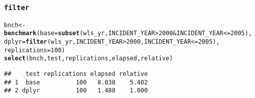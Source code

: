 \documentclass{beamer}\usepackage[]{graphicx}\usepackage[]{color}
\makeatletter
\newcommand{\hlnum}[1]{\textcolor[rgb]{0.686,0.059,0.569}{#1}}%
\newcommand{\hlopt}[1]{\textcolor[rgb]{0,0,0}{#1}}%
\newcommand{\hlstd}[1]{\textcolor[rgb]{0.345,0.345,0.345}{#1}}%
\newcommand{\hlkwb}[1]{\textcolor[rgb]{0.69,0.353,0.396}{#1}}%
\newcommand{\hlkwc}[1]{\textcolor[rgb]{0.333,0.667,0.333}{#1}}%
\newcommand{\hlkwd}[1]{\textcolor[rgb]{0.737,0.353,0.396}{\textbf{#1}}}%
\newenvironment{kframe}{%
 \def\at@end@of@kframe{}%
 \ifinner\ifhmode%
  \def\at@end@of@kframe{\end{minipage}}%
  \begin{minipage}{\columnwidth}%
 \fi\fi%
 \def\FrameCommand##1{\hskip\@totalleftmargin \hskip-\fboxsep
 \colorbox{shadecolor}{##1}\hskip-\fboxsep
     \hskip-\linewidth \hskip-\@totalleftmargin \hskip\columnwidth}%
 \MakeFramed {\advance\hsize-\width
   \@totalleftmargin\z@ \linewidth\hsize
   \@setminipage}}%
 {\par\unskip\endMakeFramed%
 \at@end@of@kframe}
\newenvironment{knitrout}{}{} %
\makeatother
\begin{document}
\begin{frame}[fragile]
  \frametitle{{\tt filter}}
\begin{knitrout}\footnotesize
{}\color{fgcolor}\begin{kframe}
\begin{alltt}
\hlstd{bnch} \hlkwb{<-}
  \hlkwd{benchmark}\hlstd{(}\hlkwc{base} \hlstd{=} \hlkwd{subset}\hlstd{(wls_yr, INCIDENT_YEAR} \hlopt{>} \hlnum{2000} \hlopt{&} \hlstd{INCIDENT_YEAR} \hlopt{<=} \hlnum{2005}\hlstd{),}
            \hlkwc{dplyr} \hlstd{=} \hlkwd{filter}\hlstd{(wls_yr, INCIDENT_YEAR} \hlopt{>} \hlnum{2000}\hlstd{, INCIDENT_YEAR} \hlopt{<=} \hlnum{2005}\hlstd{),}
            \hlkwc{replications} \hlstd{=} \hlnum{100}\hlstd{)}
\hlkwd{select}\hlstd{(bnch, test, replications, elapsed, relative)}
\end{alltt}
\begin{verbatim}
##    test replications elapsed relative
## 1  base          100   8.038    5.402
## 2 dplyr          100   1.488    1.000
\end{verbatim}
\end{kframe}
\end{knitrout}
\end{frame} 
\end{document}

